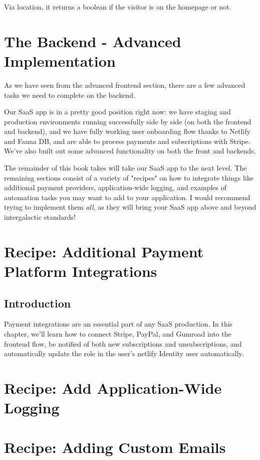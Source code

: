 \documentclass[paper=6in:9in,pagesize=pdftex,headinclude=on,footinclude=on,12pt,twoside]{scrbook}
\begin{document}
Via location, it returns a boolean if the visitor is on the homepage or not.

\chapter{The Backend - Advanced Implementation}

As we have seen from the advanced frontend section, there are a few advanced tasks we need to complete on the backend.


Our SaaS app is in a pretty good position right now: we have staging and production environments running successfully side by side (on both the frontend and backend), and we have fully working user onboarding flow thanks to Netlify and Fauna DB, and are able to process payments and subscriptions with Stripe. We've also built out some advanced functionality on both the front and backends. 

The remainder of this book takes will take our SaaS app to the next level. The remaining sections consist of a variety of "recipes" on how to integrate things like additional payment providers, application-wide logging, and examples of automation tasks you may want to add to your application. I would recommend trying to implement them \textit{all}, as they will bring your SaaS app above and beyond intergalactic standards! \rocket

\chapter{Recipe: Additional Payment Platform Integrations}

\section{Introduction}

Payment integrations are an essential part of any SaaS production. In this chapter, we'll learn how to connect Stripe, PayPal, and Gumroad into the frontend flow, be notified of both new subscriptions and unsubscriptions, and automatically update the role in the user's netlify Identity user automatically.

\chapter{Recipe: Add Application-Wide Logging}

\chapter{Recipe: Adding Custom Emails}
\end{document}
